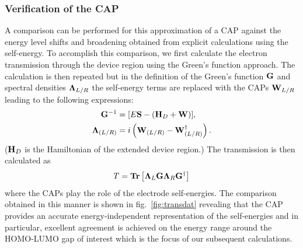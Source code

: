 \subsubsection{Verification of the \ac{CAP}}
A comparison can be performed for this approximation of a \ac{CAP} 
against the energy level shifts and broadening
obtained from explicit calculations using the self-energy. To accomplish
this comparison, we first calculate the electron transmission through
the device region using the Green's function
approach. The calculation is then repeated but in the definition of the
Green's function ${\bf G}$ and spectral densities ${\bf \Lambda}_{L/R}$ the
self-energy terms are replaced with the \acp{CAP} $\mathbf{W}_{L/R}$ leading
to the following expressions:
\begin{eqnarray}
	  \mathbf{G}^{-1} &= [E\mathbf{S} - (\mathbf{H}_D + \mathbf{W})], \\
	  \mathbf{\Lambda}_{(L/R)} &= i \left( \mathbf{W}_{(L/R)} - \mathbf{W}^\dagger_{(L/R)}
    \right).
  \label{eq:glambdadef}
\end{eqnarray}
($\mathbf{H}_D$ is the Hamiltonian of the extended device region.) The
transmission is then calculated as
\begin{equation}
  T = \mathbf{Tr} \left[ \mathbf{\Lambda}_L \mathbf{G} \mathbf{\Lambda}_R \mathbf{G}^\dagger \right]
  \label{eq:transmfromG}
\end{equation}
where the \acp{CAP} play the role of the electrode self-energies.
The comparison obtained in this manner is shown in fig.~\ref{fig:transdat}
revealing that the \ac{CAP} provides an accurate energy-independent
representation of the self-energies and in particular, excellent agreement
is achieved on the energy range around the \ac{HOMO}-\ac{LUMO} gap of
interest which is the focus of our subsequent calculations.

